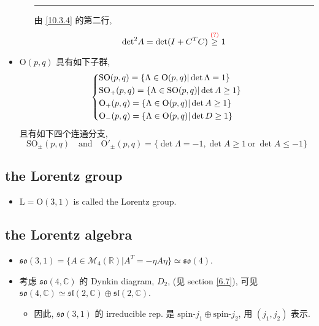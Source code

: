 \begin{itemize}
\begin{itemize}
\begin{tcolorbox}[title=proof:]
			\noindent\rule[0.5ex]{\linewidth}{0.5pt} %
			
			由 \eqref{10.3.4} 的第二行,
			\begin{equation}
				{\det}^2 A = \det(I + C^T C) \overset{\textcolor{red}{(?)}}{\geq} 1
			\end{equation}
		\end{tcolorbox}
	\end{itemize}
	
	\item $\mathrm{O}(p, q)$ 具有如下子群,
	\begin{equation}
		\begin{dcases}
			\mathrm{SO}(p, q) = \{\Lambda \in \mathrm{O}(p, q) | \det \Lambda = 1\} \\
			\mathrm{SO}_+(p, q) = \{\Lambda \in \mathrm{SO}(p, q) | \det A \geq 1\} \\
			\mathrm{O}_+(p, q) = \{\Lambda \in \mathrm{O}(p, q) | \det A \geq 1\} \\
			\mathrm{O}_-(p, q) = \{\Lambda \in \mathrm{O}(p, q) | \det D \geq 1\}
		\end{dcases}
	\end{equation}
	且有如下四个连通分支,
	\begin{equation}
		\mathrm{SO}_\pm(p, q) \quad \text{and} \quad \mathrm{O'}_\pm(p, q) = \{\det \Lambda = - 1, \det A \geq 1 \ \text{or} \ \det A \leq - 1\}
	\end{equation}
\end{itemize}

\subsection{the Lorentz group}
\begin{itemize}
	\item $\mathrm{L} = \mathrm{O}(3, 1)$ is called the Lorentz group.
\end{itemize}

\subsection{the Lorentz algebra}
\begin{itemize}
	\item $\mathfrak{so}(3, 1) = \{A \in \mathcal{M}_4(\mathbb{R}) | A^T = - \eta A \eta\} \simeq \mathfrak{so}(4)$.
	
	\item 考虑 $\mathfrak{so}(4, \mathbb{C})$ 的 Dynkin diagram, $D_2$, (见 section \ref{6.7}), 可见 $\mathfrak{so}(4, \mathbb{C}) \simeq \mathfrak{sl}(2, \mathbb{C}) \oplus \mathfrak{sl}(2, \mathbb{C})$.
	\begin{itemize}
		\item 因此, $\mathfrak{so}(3, 1)$ 的 irreducible rep. 是 $\text{spin-} j_1 \oplus \text{spin-} j_2$, 用 $(j_1, j_2)$ 表示.
	\end{itemize}
\end{itemize}

